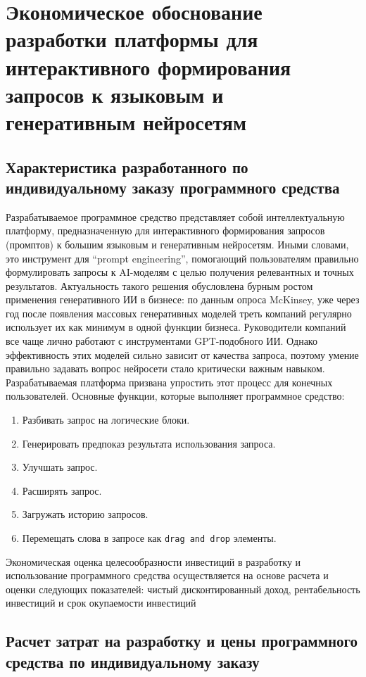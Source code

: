 \section{Экономическое обоснование разработки платформы для интерактивного формирования запросов к языковым и генеративным нейросетям}
\label{sec:economics}

\subsection{Характеристика разработанного по индивидуальному заказу программного средства}
Разрабатываемое программное средство представляет собой интеллектуальную платформу, предназначенную для интерактивного формирования запросов (промптов) к большим языковым и генеративным нейросетям. Иными словами, это инструмент для “prompt engineering”, помогающий пользователям правильно формулировать запросы к AI-моделям с целью получения релевантных и точных результатов.
Актуальность такого решения обусловлена бурным ростом применения генеративного ИИ в бизнесе: по данным опроса McKinsey, уже через год после появления массовых генеративных моделей треть компаний регулярно использует их как минимум в одной функции бизнеса​\cite{McKinsey2023}.
Руководители компаний все чаще лично работают с инструментами GPT-подобного ИИ​.
Однако эффективность этих моделей сильно зависит от качества запроса, поэтому умение правильно задавать вопрос нейросети стало критически важным навыком​.
Разрабатываемая платформа призвана упростить этот процесс для конечных пользователей.
Основные функции, которые выполняет программное средство:
\begin{enumerate}[label=\arabic*]
	\item Разбивать запрос на логические блоки.
	\item Генерировать предпоказ результата использования запроса.
	\item Улучшать запрос.
	\item Расширять запрос.
	\item Загружать историю запросов.
	\item Перемещать слова в запросе как \texttt{drag and drop} элементы.
\end{enumerate}
Экономическая оценка целесообразности инвестиций в разработку и использование программного средства осуществляется на основе расчета и оценки следующих показателей: чистый дисконтированный доход, рентабельность инвестиций и срок окупаемости инвестиций

\subsection{Расчет затрат на разработку и цены программного средства по индивидуальному заказу}

